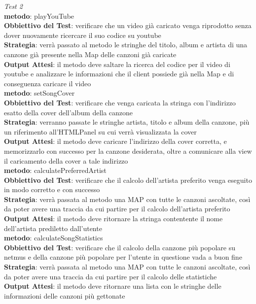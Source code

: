 \begin{itemize}
\emph{Test 2}\\
\textbf{metodo}: playYouTube\\
\textbf{Obbiettivo del Test}: verificare che un video gi\`a caricato venga
riprodotto senza dover nuovamente ricercare il suo codice su youtube\\
\textbf{Strategia}: verr\`a passato al metodo le stringhe del titolo, album e
artista di una canzone gi\`a presente nella Map delle canzoni gi\`a caricate\\
\textbf{Output Attesi}: il metodo deve saltare la ricerca del codice per il
video di youtube e analizzare le informazioni che il client possiede gi\`a nella
Map e di conseguenza caricare il video\\

\textbf{metodo}: setSongCover\\
\textbf{Obbiettivo del Test}: verificare che venga caricata la stringa con
l'indirizzo esatto della cover dell'album della canzone\\
\textbf{Strategia}: verranno passate le stringhe artista, titolo e album della
canzone, pi\`u un riferimento all'HTMLPanel su cui verr\`a visualizzata la
cover\\
\textbf{Output Attesi}: il metodo deve caricare l'indirizzo della cover
corretta, e memorizzarlo con successo per la canzone desiderata, oltre a
comunicare alla view il caricamento della cover a tale indirizzo\\

\textbf{metodo}: calculatePreferredArtist\\
\textbf{Obbiettivo del Test}: verificare che il calcolo dell'artista preferito
venga eseguito in modo corretto e con successo\\
\textbf{Strategia}: verr\`a passata al metodo una MAP con tutte le canzoni
ascoltate, cos\`i da poter avere una traccia da cui partire per il calcolo
dell'artista preferito\\
\textbf{Output Attesi}: il metodo deve ritornare la stringa contentente il
nome dell'artista prediletto dall'utente\\

\textbf{metodo}: calculateSongStatistics\\
\textbf{Obbiettivo del Test}: verificare che il calcolo della canzone pi\`u
popolare su netmus e della canzone pi\`u popolare per l'utente in questione
vada a buon fine\\
\textbf{Strategia}: verr\`a passata al metodo una MAP con
tutte le canzoni ascoltate, cos\`i da poter avere una traccia da cui partire per
il calcolo delle statistiche\\
\textbf{Output Attesi}: il metodo
deve ritornare una lista con le stringhe delle informazioni delle canzoni
pi\`u gettonate\\


\end{itemize}
